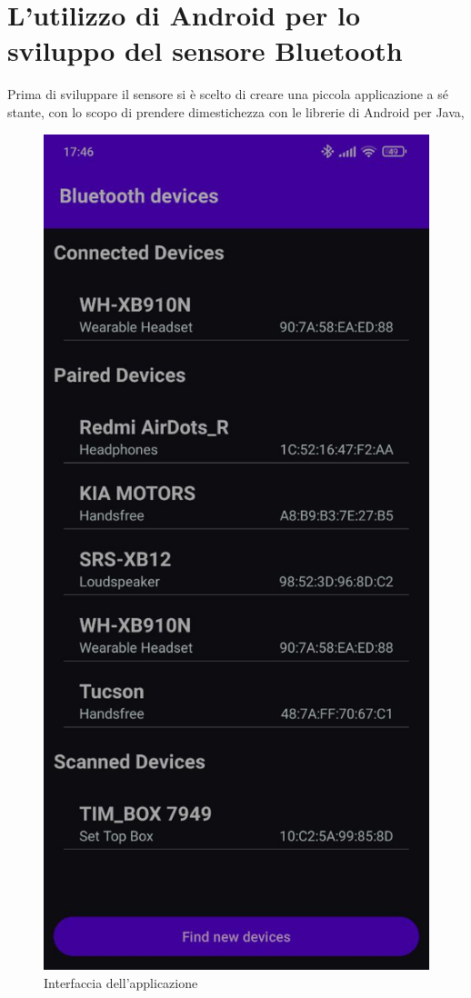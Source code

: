 \chapter{L'utilizzo di Android per lo sviluppo del sensore Bluetooth}
\label{chap:app-separata}
Prima di sviluppare il sensore si è scelto di creare una piccola applicazione a sé stante, con lo scopo di prendere dimestichezza con le librerie di Android per Java,
\begin{figure}
    \centering
    \includegraphics[width=0.9\linewidth]{images/separate_app.png}
    \caption{Interfaccia dell'applicazione}
    \label{fig:separate_app}
\end{figure}
